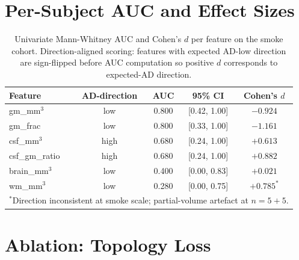 \documentclass[10pt,a4paper]{article}
\begin{document}
\section{Per-Subject AUC and Effect Sizes}

\begin{table}[!ht]
\caption{Univariate Mann-Whitney AUC and Cohen's $d$ per feature on
the smoke cohort. Direction-aligned scoring: features with expected
AD-low direction are sign-flipped before AUC computation so positive
$d$ corresponds to expected-AD direction.}
\centering
\small
\begin{tabular}{lcccc}
\toprule
Feature & AD-direction & AUC & 95\% CI & Cohen's $d$ \\
\midrule
gm\_mm$^3$       & low  & 0.800 & [0.42, 1.00] & $-0.924$ \\
gm\_frac         & low  & 0.800 & [0.33, 1.00] & $-1.161$ \\
csf\_mm$^3$      & high & 0.680 & [0.24, 1.00] & $+0.613$ \\
csf\_gm\_ratio   & high & 0.680 & [0.24, 1.00] & $+0.882$ \\
brain\_mm$^3$    & low  & 0.400 & [0.00, 0.83] & $+0.021$ \\
wm\_mm$^3$       & low  & 0.280 & [0.00, 0.75] & $+0.785^{*}$ \\
\bottomrule
\multicolumn{5}{l}{\footnotesize $^{*}$Direction inconsistent at smoke scale; partial-volume artefact at $n=5+5$.}
\end{tabular}
\end{table}

\section{Ablation: Topology Loss}
\end{document}
